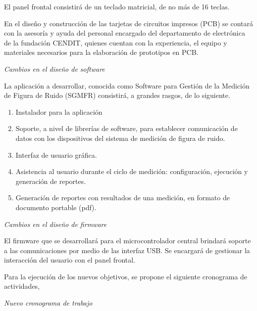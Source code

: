 \documentclass[paper=letter,oneside,fontsize=12pt, parskip=full]{article}
\begin{document}
	El panel frontal consistirá de un teclado matricial, de no más de 16 teclas. 
	
	En el diseño y construcción de las tarjetas de circuitos impresos (PCB) se contará con la asesoría y ayuda del personal encargado del departamento de electrónica de la fundación CENDIT, quienes cuentan con la experiencia, el equipo y materiales necesarios para la elaboración de prototipos en PCB.
	
	\emph{Cambios en el diseño de software}
	
	La aplicación a desarrollar, conocida como Software para Gestión de la Medición de Figura de Ruido (SGMFR) consistirá, a grandes rasgos, de lo siguiente.
	
	\begin{enumerate}
		\item Instalador para la aplicación
		\item Soporte, a nivel de librerías de software, para establecer comunicación de datos con los dispositivos del sistema de medición de figura de ruido.
		\item Interfaz de usuario gráfica.
		\item Asistencia al usuario durante el ciclo de medición: configuración, ejecución y generación de reportes.
		\item Generación de reportes con resultados de una medición, en formato de documento portable (pdf).
	\end{enumerate}

	\emph{Cambios en el diseño de firmware}
	
	El firmware que se desarrollará para el microcontrolador central brindará soporte a las comunicaciones por medio de las interfaz USB. Se encargará de gestionar la interacción del usuario con el panel frontal. 	
	
	Para la ejecución de los nuevos objetivos, se propone el siguiente cronograma de actividades,
	
	\newpage
	
	\emph{Nuevo cronograma de trabajo}
\end{document}
